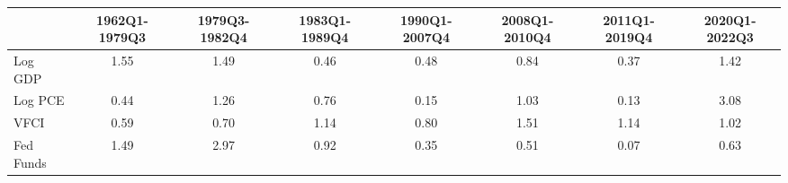 \begin{table}[ht]
\centering
\begin{tabular}{lccccccc}
  \hline
 & 1962Q1-1979Q3 & 1979Q3-1982Q4 & 1983Q1-1989Q4 & 1990Q1-2007Q4 & 2008Q1-2010Q4 & 2011Q1-2019Q4 & 2020Q1-2022Q3 \\ 
  \hline
Log GDP & 1.55 & 1.49 & 0.46 & 0.48 & 0.84 & 0.37 & 1.42 \\ 
  Log PCE & 0.44 & 1.26 & 0.76 & 0.15 & 1.03 & 0.13 & 3.08 \\ 
  VFCI & 0.59 & 0.70 & 1.14 & 0.80 & 1.51 & 1.14 & 1.02 \\ 
  Fed Funds & 1.49 & 2.97 & 0.92 & 0.35 & 0.51 & 0.07 & 0.63 \\ 
   \hline
\end{tabular}
\end{table}
